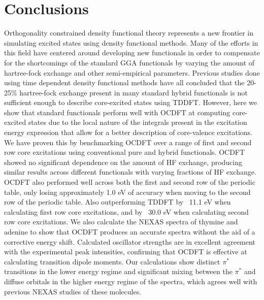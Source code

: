 \documentclass[12pt]{article}
\begin{document}
\section{Conclusions}
Orthogonality constrained density functional theory represents a new frontier in simulating excited states using density functional methods. Many of the efforts in this field have centered around developing new functionals in order to compensate for the shortcomings of the standard GGA functionals by varying the amount of hartree-fock exchange and other semi-empirical parameters. Previous studies done using time dependent density functional methods have all concluded that the 20-25\% hartree-fock exchange present in many standard hybrid functionals is not sufficient enough to describe core-excited states using TDDFT. However, here we show that standard functionals perform well with OCDFT at computing core-excited states due to the local nature of the integrals present in the excitation energy expression that allow for a better description of core-valence excitations. We have proven this by benchmarking OCDFT over a range of first and second row core excitations using conventional pure and hybrid functionals. OCDFT showed no significant dependence on the amount of HF exchange, producing similar results across different functionals with varying fractions of HF exchange. OCDFT also performed well across both the first and second row of the periodic table, only losing approximately 1.0 eV of accuracy when moving to the second row of the periodic table. Also outperforming TDDFT by ~11.1 eV when calculating first row core excitations, and by ~30.0 eV when calculating second row core excitations. We also calculate the NEXAS spectra of thymine and adenine to show that OCDFT produces an accurate spectra without the aid of a corrective energy shift. Calculated oscillator strengths are in excellent agreement with the experimental peak intensities, confirming that OCDFT is effective at calculating transition dipole moments. Our calculations show distinct $\pi^*$ transitions in the lower energy regime and significant mixing between the $\pi^*$ and diffuse orbitals in the higher energy regime of the spectra, which agrees well with previous NEXAS studies of these molecules.
\\ \\ 
\footnotesize{
}
\end{document}
